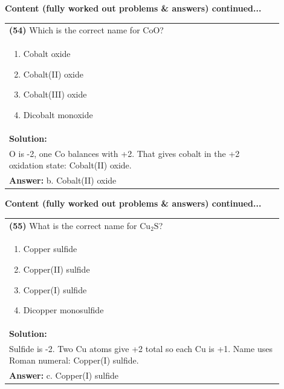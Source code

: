 \documentclass{article}
\begin{document}
\newpage
\noindent
{\large\textbf{Content (fully worked out problems \& answers) continued...}}\\[0.2em]

\begin{tabular}{|p{0.9\linewidth}|}
\hline
\vspace{0.2cm}
\textbf{(54)} Which is the correct name for $\text{CoO}$? \\
\begin{minipage}[t]{0.85\linewidth}
\begin{enumerate}[label=\alph*.]
\item Cobalt oxide \
\item Cobalt(II) oxide \
\item Cobalt(III) oxide \
\item Dicobalt monoxide
\end{enumerate}
\end{minipage}\\
\hline
\vspace{0.2cm}
\textbf{Solution:} \\
O is -2, one Co balances with +2. That gives cobalt in the +2 oxidation state: Cobalt(II) oxide. \\
\hline
\vspace{0.2cm}
\textbf{Answer:} b. Cobalt(II) oxide \
\hline
\end{tabular}

\newpage
\noindent
{\large\textbf{Content (fully worked out problems \& answers) continued...}}\\[0.2em]

\begin{tabular}{|p{0.9\linewidth}|}
\hline
\vspace{0.2cm}
\textbf{(55)} What is the correct name for $\text{Cu}_2\text{S}$? \\
\begin{minipage}[t]{0.85\linewidth}
\begin{enumerate}[label=\alph*.]
\item Copper sulfide \
\item Copper(II) sulfide \
\item Copper(I) sulfide \
\item Dicopper monosulfide
\end{enumerate}
\end{minipage}\\
\hline
\vspace{0.2cm}
\textbf{Solution:} \\
Sulfide is -2. Two Cu atoms give +2 total so each Cu is +1. Name uses Roman numeral: Copper(I) sulfide. \\
\hline
\vspace{0.2cm}
\textbf{Answer:} c. Copper(I) sulfide \
\hline
\end{tabular}
\end{document}
